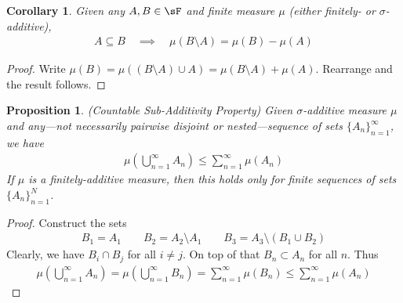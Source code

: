 \documentclass[12pt]{article}
\theoremstyle{plain}
\newtheorem{prop}[thm]{Proposition}
\newtheorem{cor}[thm]{Corollary}
\theoremstyle{definition}
\theoremstyle{remark}
\newcommand{\ninf}{_{n=1}^\infty}
\newcommand{\nN}{_{n=1}^N}
\begin{document}
\begin{cor}
Given any $A,B\in\sF$ and \emph{finite} measure $\mu$
(either finitely- or $\sigma$-additive),
\begin{align*}
  A\subseteq B\quad\implies\quad
  \mu(B\setminus A) = \mu(B) - \mu(A)
\end{align*}
\end{cor}
\begin{proof}
Write
$\mu(B) = \mu((B\setminus A) \cup A) = \mu(B\setminus A) + \mu(A)$.
Rearrange and the result follows.
\end{proof}

\begin{prop}\emph{(Countable Sub-Additivity Property)}
Given $\sigma$-additive measure $\mu$ and \emph{any}---not necessarily
pairwise disjoint or nested---sequence of sets $\{A_n\}\ninf$, we have
\begin{align*}
  \mu\left(\bigcup^\infty_{n=1} A_n\right)
  \leq \sum\ninf \mu(A_n)
\end{align*}
If $\mu$ is a finitely-additive measure, then this holds only for finite
sequences of sets $\{A_n\}\nN$.
\end{prop}
\begin{proof}
Construct the sets
\begin{align*}
  B_1 = A_1 \qquad B_2 = A_2 \setminus A_1
  \qquad B_3 = A_3 \setminus (B_1 \cup B_2)
\end{align*}
Clearly, we have $B_i \cap B_j$ for all $i\neq j$. On top of that $B_n
\subset A_n$ for all $n$. Thus
\begin{align*}
  \mu\left(\bigcup^\infty_{n=1} A_n\right)
  = \mu\left(\bigcup^\infty_{n=1} B_n\right)
  = \sum\ninf \mu(B_n)
  \leq \sum\ninf \mu(A_n)
\end{align*}
\end{proof}
\end{document}
